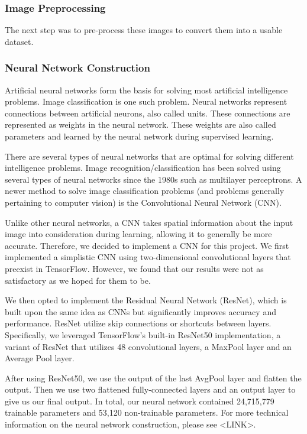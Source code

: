 \documentclass{article}
\begin{document}
  \subsubsection{Image Preprocessing}
  The next step was to pre-process these images to convert them into a
  usable dataset. 

  
  \subsubsection{Neural Network Construction}
  Artificial neural networks form the basis for solving most artificial intelligence 
  problems. Image classification is one such problem. Neural networks represent connections 
  between artificial neurons, also called units. These connections are represented as weights 
  in the neural network. These weights are also called parameters and 
  learned by the neural network during supervised learning.

  There are several types of neural networks that are optimal for solving different 
  intelligence problems. Image recognition/classification has been solved using 
  several types of neural networks since the 1980s such as multilayer perceptrons. 
  A newer method to solve image classification problems (and problems generally 
  pertaining to computer vision) is the Convolutional Neural Network (CNN). 
  
  Unlike other neural networks, a CNN takes spatial information about the input image 
  into consideration during learning, allowing it to generally be more accurate. Therefore, 
  we decided to implement a CNN for this project. We first implemented a simplistic 
  CNN using two-dimensional convolutional layers that preexist in TensorFlow. However, 
  we found that our results were not as satisfactory as we hoped for them to be.

  We then opted to implement the Residual Neural Network (ResNet), which is built
  upon the same idea as CNNs but significantly improves accuracy and performance. 
  ResNet utilize skip connections or shortcuts between layers. Specifically, we leveraged 
  TensorFlow's built-in ResNet50 implementation, a variant of ResNet that utilizes 
  48 convolutional layers, a MaxPool layer and an Average Pool layer. 

  After using ResNet50, we use the output of the last AvgPool layer and flatten the output.
  Then we use two flattened fully-connected layers and an output layer to give us our final 
  output. In total, our neural network contained 24,715,779 trainable parameters and 
  53,120 non-trainable parameters. 
  For more technical information on the neural network construction, please see <LINK>.
  
\end{document}
